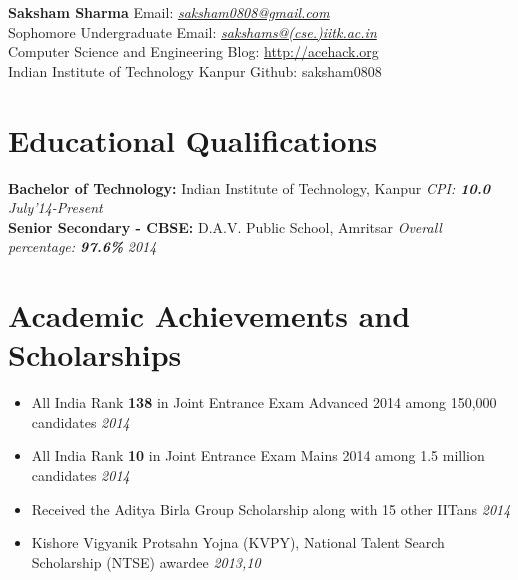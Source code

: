 \documentclass[11pt,a4paper]{article}
\begin{document}
\textbf{\huge{Saksham Sharma}} \hfill Email: \href{mailto:saksham0808@gmail.com}{\textit{saksham0808@gmail.com}}\\
Sophomore Undergraduate    \hfill  Email: \href{mailto:sakshams@cse.iitk.ac.in}{\textit{sakshams@(cse.)iitk.ac.in}}\\
Computer Science and Engineering      \hfill Blog: \url{http://acehack.org}\\
Indian Institute of Technology Kanpur \hfill Github: saksham0808

\vspace{-0.4cm}
\section*{Educational Qualifications}
\vspace{-0.2cm}
\textbf{\large{Bachelor of Technology:}} Indian Institute of Technology, Kanpur \emph{CPI: \textbf{10.0}} \hfill\textit{ July'14-Present}\\
\textbf{\large{Senior Secondary - CBSE:}} D.A.V. Public School, Amritsar \emph{Overall percentage: \textbf{97.6\%}} \hfill\textit{ 2014}


\vspace{-0.5cm}
\section*{Academic Achievements and Scholarships}
\vspace{-0.2cm}
\begin {itemize}
\item All India Rank \textbf{138} in Joint Entrance Exam Advanced 2014 among 150,000 candidates            	\hfill \textit{2014}
\item All India Rank \textbf{10} in Joint Entrance Exam Mains 2014 among 1.5 million candidates              \hfill \textit{2014}
\item Received the Aditya Birla Group Scholarship along with 15 other IITans                        \hfill \textit{2014}
\item Kishore Vigyanik Protsahn Yojna (KVPY), National Talent Search Scholarship (NTSE) awardee
      \hfill \textit{2013,10}
\end{itemize}

\vspace{-0.6cm}
\end{document}
